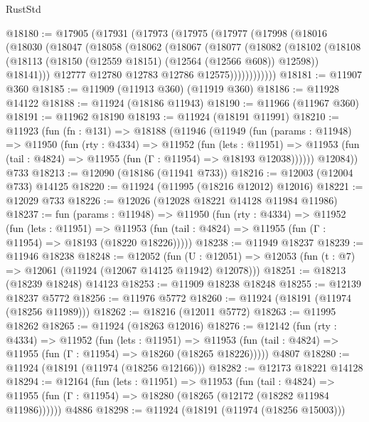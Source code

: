 \begin{lexlean}{RustStd}
\begin{coremodule}
@18180 := @17905
    (@17931
      (@17973
        (@17975
          (@17977
            (@17998
              (@18016
                (@18030
                  (@18047
                    (@18058
                      (@18062
                        (@18067
                          (@18077
                            (@18082
                              (@18102
                                (@18108
                                  (@18113 (@18150 (@12559 @18151) (@12564 (@12566 @608)) @12598))
                                  @18141)))
                            @12777
                            @12780
                            @12783
                            @12786
                            @12575))))))))))))
@18181 := @11907 @360
@18185 := @11909 (@11913 @360) (@11919 @360)
@18186 := @11928 @14122
@18188 := @11924 (@18186 @11943)
@18190 := @11966 (@11967 @360)
@18191 := @11962 @18190
@18193 := @11924 (@18191 @11991)
@18210 := @11923
    (fun (fn : @131) =>
    @18188
      (@11946
        (@11949
          (fun (params : @11948) =>
          @11950
            (fun (rty : @4334) =>
            @11952
              (fun (lets : @11951) =>
              @11953 (fun (tail : @4824) => @11955 (fun (Γ : @11954) => @18193 @12038))))))
        @12084))
    @733
@18213 := @12090 (@18186 (@11941 @733))
@18216 := @12003 (@12004 @733) @14125
@18220 := @11924 (@11995 (@18216 @12012) @12016)
@18221 := @12029 @733
@18226 := @12026 (@12028 @18221 @14128 @11984 @11986)
@18237 := fun (params : @11948) =>
  @11950
    (fun (rty : @4334) =>
    @11952
      (fun (lets : @11951) =>
      @11953 (fun (tail : @4824) => @11955 (fun (Γ : @11954) => @18193 (@18220 @18226)))))
@18238 := @11949 @18237
@18239 := @11946 @18238
@18248 := @12052
    (fun (U : @12051) => @12053 (fun (t : @7) => @12061 (@11924 (@12067 @14125 @11942) @12078)))
@18251 := @18213 (@18239 @18248) @14123
@18253 := @11909 @18238 @18248
@18255 := @12139 @18237 @5772
@18256 := @11976 @5772
@18260 := @11924 (@18191 (@11974 (@18256 @11989)))
@18262 := @18216 (@12011 @5772)
@18263 := @11995 @18262
@18265 := @11924 (@18263 @12016)
@18276 := @12142
    (fun (rty : @4334) =>
    @11952
      (fun (lets : @11951) =>
      @11953 (fun (tail : @4824) => @11955 (fun (Γ : @11954) => @18260 (@18265 @18226)))))
    @4807
@18280 := @11924 (@18191 (@11974 (@18256 @12166)))
@18282 := @12173 @18221 @14128
@18294 := @12164
    (fun (lets : @11951) =>
    @11953
      (fun (tail : @4824) =>
      @11955 (fun (Γ : @11954) => @18280 (@18265 (@12172 (@18282 @11984 @11986))))))
    @4886
@18298 := @11924 (@18191 (@11974 (@18256 @15003)))

\end{coremodule}
\end{lexlean}
